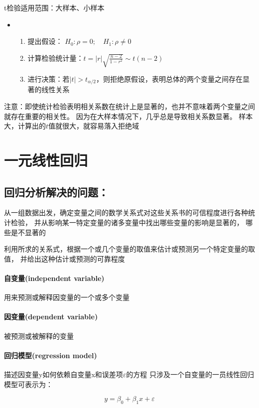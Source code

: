 \documentclass[UTF8,10pt]{book}
\begin{document}
t检验适用范围：大样本、小样本

\begin{itemize}
	\item [] {
		\begin{enumerate}
			\item 提出假设： $H_0:\rho=0; \quad H_1:\rho\neq 0$
			\item 计算检验统计量：$ t = |r| \sqrt{ \frac{n-2}{1-r^2} } \sim t(n-2) $
			\item 进行决策：若$|t|>t_{\alpha / 2}$，则拒绝原假设，表明总体的两个变量之间存在显著的线性关系 
			
		\end{enumerate}
	}
\end{itemize}

注意：即使统计检验表明相关系数在统计上是显著的，也并不意味着两个变量之间就存在重要的相关性。
因为在大样本情况下，几乎总是导致相关系数显著。 样本大，计算出的$t$值就很大，就容易落入拒绝域

\section{一元线性回归}
\subsection{回归分析解决的问题：}	
从一组数据出发，确定变量之间的数学关系式对这些关系书的可信程度进行各种统计检验，
并从影响某一特定变量的诸多变量中找出哪些变量的影响是显著的，
哪些是不显著的

利用所求的关系式，根据一个或几个变量的取值来估计或预测另一个特定变量的取值，
并给出这种估计或预测的可靠程度

\paragraph{自变量(independent variable)	}用来预测或解释因变量的一个或多个变量
\paragraph{因变量(dependent variable)	}被预测或被解释的变量
\paragraph{回归模型(regression model)	}描述因变量y如何依赖自变量x和误差项$\varepsilon$的方程 只涉及一个自变量的一员线性回归模型可表示为： 

$$y = \beta_0 + \beta_1 x+ \varepsilon$$ 
\end{document}
